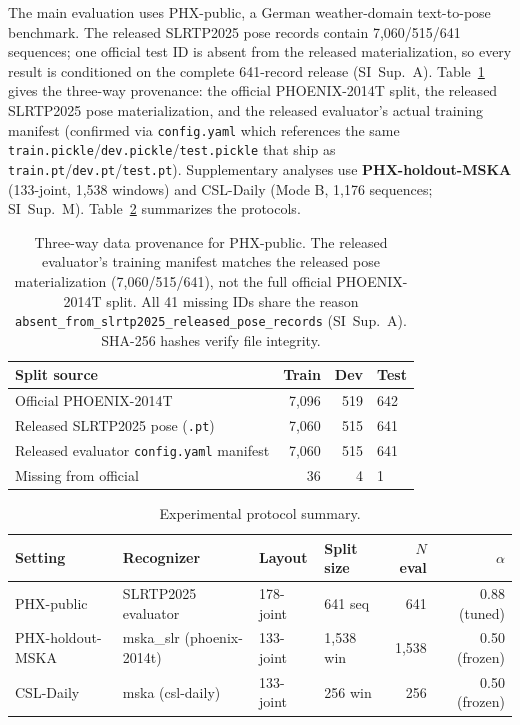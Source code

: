 \documentclass[pdflatex,sn-chicago]{sn-jnl}
\begin{document}
The main evaluation uses PHX-public, a German weather-domain text-to-pose benchmark. The released SLRTP2025 pose records contain 7,060/515/641 sequences; one official test ID is absent from the released materialization, so every result is conditioned on the complete 641-record release (SI~Sup.~A). Table~\ref{tab:provenance} gives the three-way provenance: the official PHOENIX-2014T split, the released SLRTP2025 pose materialization, and the released evaluator's actual training manifest (confirmed via \texttt{config.yaml} which references the same \texttt{train.pickle}/\texttt{dev.pickle}/\texttt{test.pickle} that ship as \texttt{train.pt}/\texttt{dev.pt}/\texttt{test.pt}). Supplementary analyses use \textbf{PHX-holdout-MSKA} (133-joint, 1,538 windows) and CSL-Daily (Mode B, 1,176 sequences; SI~Sup.~M). Table~\ref{tab:protocol_summary} summarizes the protocols.

\begin{table}[t]
\centering
\scriptsize
\caption{Three-way data provenance for PHX-public. The released evaluator's training manifest matches the released pose materialization (7{,}060/515/641), not the full official PHOENIX-2014T split. All 41 missing IDs share the reason \texttt{absent\_from\_slrtp2025\_released\_pose\_records} (SI~Sup.~A). SHA-256 hashes verify file integrity.}
\label{tab:provenance}
\begin{tabular}{lrrp{3.5cm}}
\toprule
Split source & Train & Dev & Test \\
\midrule
Official PHOENIX-2014T & 7{,}096 & 519 & 642 \\
Released SLRTP2025 pose (\texttt{.pt}) & 7{,}060 & 515 & 641 \\
Released evaluator \texttt{config.yaml} manifest & 7{,}060 & 515 & 641 \\
\midrule
Missing from official & 36 & 4 & 1 \\
\bottomrule
\end{tabular}
\end{table}

\begin{table}[t]
\centering
\scriptsize
\caption{Experimental protocol summary.}
\label{tab:protocol_summary}
\begin{tabular}{llllrr}
\toprule
Setting & Recognizer & Layout & Split size & $N$ eval & $\alpha$ \\
\midrule
PHX-public  & SLRTP2025 evaluator       & 178-joint & 641 seq      & 641    & 0.88 (tuned) \\
PHX-holdout-MSKA & mska\_slr (phoenix-2014t) & 133-joint & 1{,}538 win  & 1{,}538 & 0.50 (frozen) \\
CSL-Daily   & mska (csl-daily)           & 133-joint & 256 win      & 256    & 0.50 (frozen) \\
\bottomrule
\end{tabular}
\end{table}
\end{document}
